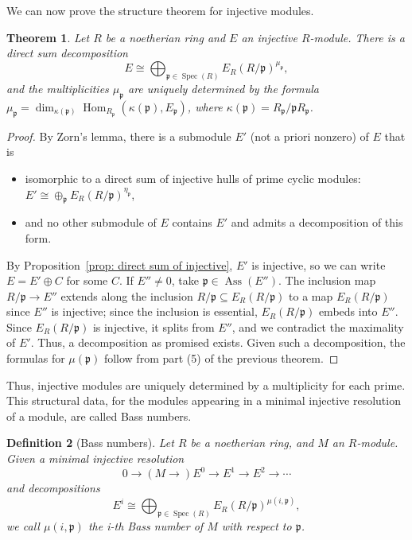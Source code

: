 \documentclass[11pt]{book}
\newtheorem{theorem}{Theorem}[chapter]
\newtheorem{definition}[theorem]{Definition}
\numberwithin{equation}{section}
\numberwithin{theorem}{chapter}
\theoremstyle{definition}
\newtheorem*{basic properties}{Basic Properties}
\newtheorem*{Important Remark}{Important Remark}
\theoremstyle{remark}
\newcommand{\p}{\mathfrak{p}}
\newcommand{\Spec}{\operatorname{Spec}}
\newcommand{\Hom}{\operatorname{Hom}}
\newcommand{\Ass}{\operatorname{Ass}}
\renewcommand{\dim}{\operatorname{dim}}
\begin{document}
We can now prove the structure theorem for injective modules.

\begin{theorem}\label{structure of injectives}
	Let $R$ be a noetherian ring and $E$ an injective $R$-module. There is a direct sum decomposition
	\[ E \cong \bigoplus_{\p \in \Spec(R)} E_R(R/\p)^{\mu_\p}, \]
	and the multiplicities $\mu_\p$ are uniquely determined by the formula $\mu_\p=\dim_{\kappa(\p)} \Hom_{R_\p}(\kappa(\p), E_\p)$, where $\kappa(\p)=R_\p / \p R_\p$.
	\end{theorem}
\begin{proof}
	By Zorn's lemma, there is a submodule $E'$ (not a priori nonzero) of $E$ that is 
	\begin{itemize}
		\item isomorphic to a direct sum of injective hulls of prime cyclic modules: $E'\cong \oplus_\p E_R(R/\p)^{\eta_\p}$, 
		\item and no other submodule of $E$ contains $E'$ and admits a decomposition of this form.
	\end{itemize}  
By Proposition~\ref{prop: direct sum of injective}, $E'$ is injective, so we can write $E=E'\oplus C$ for some $C$. If $E''\neq 0$, take $\p\in \Ass(E'')$. The inclusion map $R/\p \to E''$ extends along the inclusion $R/\p\subseteq E_R(R/\p)$ to a map $E_R(R/\p)$ since $E''$ is injective; since the inclusion is essential, $E_R(R/\p)$ embeds into $E''$. Since $E_R(R/\p)$ is injective, it splits from $E''$, and we contradict the maximality of $E'$. Thus, a decomposition as promised exists. Given such a decomposition, the formulas for $\mu(\p)$ follow from part (5) of the previous theorem.
\end{proof}


Thus, injective modules are uniquely determined by a multiplicity for each prime. This structural data, for the modules appearing in a minimal injective resolution of a module, are called Bass numbers.

\begin{definition}[Bass numbers]\index{$\mu(i,\p)$}
	Let $R$ be a noetherian ring, and $M$ an $R$-module. Given a minimal injective resolution 
	\[0 \to ( M \to ) E^0 \to E^1 \to E^2 \to \cdots \]
	and decompositions
		\[ E^i \cong \bigoplus_{\p \in \Spec(R)} E_R(R/\p)^{\mu(i,\p)}, \]
		we call $\mu(i,\p)$ the \emph{i-th Bass number of $M$ with respect to $\p$}.
\end{definition}
\end{document}
